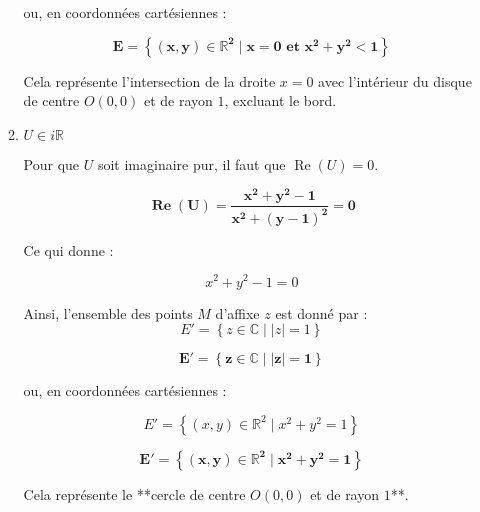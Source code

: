 \documentclass[a4paper,12pt]{article}
\begin{document}
\begin{enumerate}
\begin{enumerate}
ou, en coordonnées cartésiennes :

\begin{resultbox}
    \[
    \mathbf{E = \left\{ (x, y) \in \mathbb{R}^2 \mid x = 0 \text{ et } x^2 + y^2 < 1 \right\}}
    \]
\end{resultbox}
Cela représente l'intersection de la droite \( x = 0 \) avec l'intérieur du disque de centre \( O(0,0) \) et de rayon \( 1 \), excluant le bord.

\begin{center}
\end{center}
        \item $U \in i\mathbb{R}$

    Pour que \( U \) soit imaginaire pur, il faut que \( \operatorname{Re}(U) = 0 \).

\begin{resultbox}
    \[
    \mathbf{\operatorname{Re}(U) = \frac{x^2 + y^2 - 1}{x^2 + (y - 1)^2} = 0}
    \]
\end{resultbox}

    Ce qui donne :

    \[
    x^2 + y^2 - 1 = 0
    \]

    Ainsi, l'ensemble des points \( M \) d'affixe \( z \) est donné par :
    \[ E' = \left\{ z \in \mathbb{C} \mid |z| = 1 \right\} \]

\begin{resultbox}
    \[
    \mathbf{ E' = \left\{ z \in \mathbb{C} \mid |z| = 1 \right\}}
    \]
\end{resultbox}

    ou, en coordonnées cartésiennes :

    \[
    E' = \left\{ (x, y) \in \mathbb{R}^2 \mid x^2 + y^2 = 1 \right\}
    \]
\begin{resultbox}
    \[
    \mathbf{ E' = \left\{ (x, y) \in \mathbb{R}^2 \mid x^2 + y^2 = 1 \right\}}
    \]
\end{resultbox}
    Cela représente le **cercle de centre \( O(0,0) \) et de rayon \( 1 \)**.


\end{enumerate}
\end{enumerate}
\end{document}
